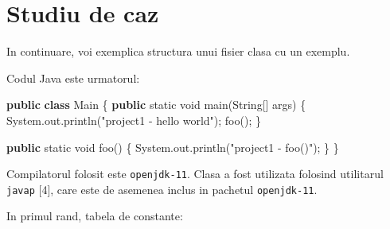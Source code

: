 \documentclass[]{article}
\newenvironment{Shaded}{}{}
\newcommand{\KeywordTok}[1]{\textcolor[rgb]{0.00,0.44,0.13}{\textbf{#1}}}
\newcommand{\DataTypeTok}[1]{\textcolor[rgb]{0.56,0.13,0.00}{#1}}
\newcommand{\StringTok}[1]{\textcolor[rgb]{0.25,0.44,0.63}{#1}}
\newcommand{\FunctionTok}[1]{\textcolor[rgb]{0.02,0.16,0.49}{#1}}
\newcommand{\BuiltInTok}[1]{#1}
\newcommand{\NormalTok}[1]{#1}
\begin{document}
\section{Studiu de caz}\label{studiu-de-caz}

In continuare, voi exemplica structura unui fisier clasa cu un exemplu.

Codul Java este urmatorul:

\begin{Shaded}
\begin{Highlighting}[]
\KeywordTok{public} \KeywordTok{class}\NormalTok{ Main \{}
    \KeywordTok{public} \DataTypeTok{static} \DataTypeTok{void} \FunctionTok{main}\NormalTok{(}\BuiltInTok{String}\NormalTok{[] args) \{}
        \BuiltInTok{System}\NormalTok{.}\FunctionTok{out}\NormalTok{.}\FunctionTok{println}\NormalTok{(}\StringTok{"project1 - hello world"}\NormalTok{);}
        \FunctionTok{foo}\NormalTok{();}
\NormalTok{    \}}

    \KeywordTok{public} \DataTypeTok{static} \DataTypeTok{void} \FunctionTok{foo}\NormalTok{() \{}
        \BuiltInTok{System}\NormalTok{.}\FunctionTok{out}\NormalTok{.}\FunctionTok{println}\NormalTok{(}\StringTok{"project1 - foo()"}\NormalTok{);}
\NormalTok{    \}}
\NormalTok{\}}
\end{Highlighting}
\end{Shaded}

Compilatorul folosit este \texttt{openjdk-11}. Clasa a fost utilizata
folosind utilitarul \texttt{javap} {[}4{]}, care este de asemenea inclus
in pachetul \texttt{openjdk-11}.

In primul rand, tabela de constante:
\end{document}

